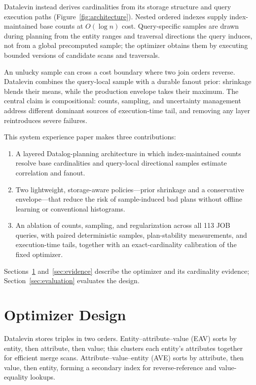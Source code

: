 \documentclass[sigconf]{cidr-2027}
\begin{document}
Datalevin instead derives cardinalities from its storage structure and query execution
paths (Figure~\ref{fig:architecture}). Nested ordered indexes supply
index-maintained base counts at $O(\log n)$ cost. Query-specific samples are drawn
during planning from the entity ranges and traversal directions the query
induces, not from a global precomputed sample; the optimizer obtains them by
executing bounded versions of candidate scans and traversals.

An unlucky sample can cross a cost boundary where two join orders reverse.
Datalevin combines the query-local sample with a durable fanout prior:
shrinkage blends their means, while the production envelope takes their maximum.
The central claim is compositional: counts, sampling, and uncertainty
management address different dominant sources of execution-time tail, and
removing any layer reintroduces severe failures.

This system experience paper makes three contributions:

\begin{enumerate}
  \item A layered Datalog-planning architecture in which index-maintained counts
  resolve base cardinalities and query-local directional samples estimate
  correlation and fanout.
  \item Two lightweight, storage-aware policies---prior shrinkage and a
  conservative envelope---that reduce the risk of sample-induced bad plans
  without offline learning or conventional histograms.
  \item An ablation of counts, sampling, and regularization across all 113 JOB
  queries, with paired deterministic samples, plan-stability measurements,
  and execution-time tails, together with an exact-cardinality calibration of
  the fixed optimizer.
\end{enumerate}

Sections~\ref{sec:optimizer} and~\ref{sec:evidence} describe the optimizer and
its cardinality evidence; Section~\ref{sec:evaluation} evaluates the design.

\section{Optimizer Design}
\label{sec:optimizer}

Datalevin stores triples in two orders. Entity--attribute--value (EAV)
sorts by entity, then attribute, then value; this clusters each entity's
attributes together for efficient merge scans. Attribute--value--entity (AVE)
sorts by attribute, then value, then entity, forming a secondary index for
reverse-reference and value-equality lookups.
\end{document}
